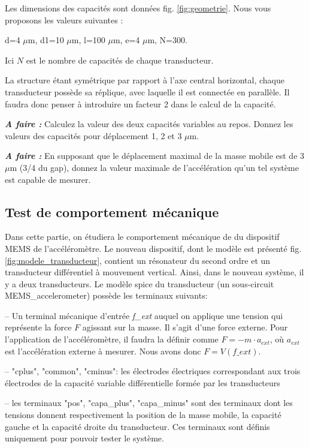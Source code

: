 \documentclass[12pt,A4,onecolumn,french]{article}
\begin{document}
Les dimensions des capacités sont données fig. \ref{fig:geometrie}. Nous vous proposons les valeurs suivantes : 

d=4 $\mu$m, d1=10 $\mu$m, l=100 $\mu$m, e=4 $\mu$m, N=300. 

Ici $N$ est le nombre de capacités de chaque transducteur. 

La structure étant symétrique par rapport à l'axe central horizontal, chaque transducteur possède sa réplique, avec laquelle il est connectée en parallèle. Il faudra donc penser à introduire un facteur 2 dans le calcul de la capacité.  

\emph{\bf A faire :} Calculez la valeur des deux capacités variables au repos. Donnez les valeurs des capacités pour déplacement 1, 2 et 3 $\mu$m. 

\emph{\bf A faire :} En supposant que le déplacement maximal de la masse mobile est de 3 $\mu$m (3/4 du gap), donnez la valeur maximale de l'accélération qu'un tel système est capable de mesurer.

\subsection{Test de comportement mécanique}

Dans cette partie, on étudiera le comportement mécanique de du dispositif MEMS de l'accéléromètre. Le nouveau dispositif, dont le modèle est présenté fig. \ref{fig:modele_transducteur}, contient un résonateur du second ordre et un transducteur différentiel à mouvement vertical. Ainsi, dans le nouveau système, il y a deux transducteurs. Le modèle spice du transducteur (un sous-circuit MEMS\_accelerometer) possède les terminaux suivants: 

-- Un terminal mécanique d'entrée \emph{f\_ext} auquel on applique une tension qui représente la force $F$ agissant sur la masse. Il s'agit d'une force externe. Pour l'application de l'accéléromètre, il faudra la définir comme $F=-m\cdot a_{ext}$, où $a_{ext}$ est l'accélération externe à mesurer. Nous avons donc $F=V(f\_ext)$. 

-- "cplus", "common", "cminus": les électrodes électriques correspondant aux trois électrodes de la capacité variable différentielle formée par les transducteurs

-- les terminaux "pos", "capa\_plus", "capa\_minus" sont des terminaux dont les tensions donnent respectivement la position de la masse mobile, la capacité gauche et la capacité droite du transducteur. Ces terminaux sont définis uniquement pour pouvoir tester le système.  
\end{document}

